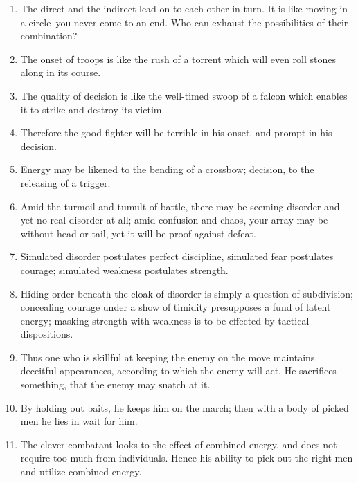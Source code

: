 \begin{enumerate}
  \item The direct and the indirect lead on to each other in turn. It
    is like moving in a circle--you never come to an end. Who can
    exhaust the possibilities of their combination?

  \item The onset of troops is like the rush of a torrent which will
    even roll stones along in its course.

  \item The quality of decision is like the well-timed swoop of a
    falcon which enables it to strike and destroy its victim.

  \item Therefore the good fighter will be terrible in his onset, and
    prompt in his decision.

  \item Energy may be likened to the bending of a crossbow; decision,
    to the releasing of a trigger.

  \item Amid the turmoil and tumult of battle, there may be seeming
    disorder and yet no real disorder at all; amid confusion and
    chaos, your array may be without head or tail, yet it will be
    proof against defeat.

  \item Simulated disorder postulates perfect discipline, simulated
    fear postulates courage; simulated weakness postulates strength.

  \item Hiding order beneath the cloak of disorder is simply a
    question of subdivision; concealing courage under a show of
    timidity presupposes a fund of latent energy; masking strength
    with weakness is to be effected by tactical dispositions.

  \item Thus one who is skillful at keeping the enemy on the move
    maintains deceitful appearances, according to which the enemy will
    act. He sacrifices something, that the enemy may snatch at it.

  \item By holding out baits, he keeps him on the march; then with a
    body of picked men he lies in wait for him.

  \item The clever combatant looks to the effect of combined energy,
    and does not require too much from individuals. Hence his ability
    to pick out the right men and utilize combined energy.


\end{enumerate}
